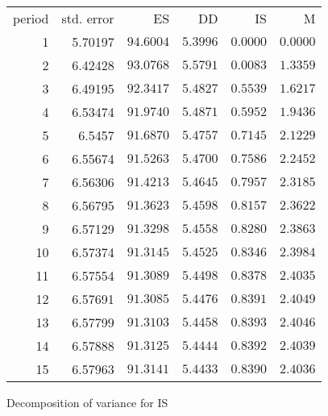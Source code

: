 \documentclass[11pt]{article}
\begin{document}
\begin{longtable}{rrrrrr}
period &  std. error &  ES &  DD &  IS &  M \\
1 & 5.70197 & $94.6004$ & $5.3996$ & $0.0000$ & $0.0000$\\
2 & 6.42428 & $93.0768$ & $5.5791$ & $0.0083$ & $1.3359$\\
3 & 6.49195 & $92.3417$ & $5.4827$ & $0.5539$ & $1.6217$\\
4 & 6.53474 & $91.9740$ & $5.4871$ & $0.5952$ & $1.9436$\\
5 & 6.5457 & $91.6870$ & $5.4757$ & $0.7145$ & $2.1229$\\
6 & 6.55674 & $91.5263$ & $5.4700$ & $0.7586$ & $2.2452$\\
7 & 6.56306 & $91.4213$ & $5.4645$ & $0.7957$ & $2.3185$\\
8 & 6.56795 & $91.3623$ & $5.4598$ & $0.8157$ & $2.3622$\\
9 & 6.57129 & $91.3298$ & $5.4558$ & $0.8280$ & $2.3863$\\
10 & 6.57374 & $91.3145$ & $5.4525$ & $0.8346$ & $2.3984$\\
11 & 6.57554 & $91.3089$ & $5.4498$ & $0.8378$ & $2.4035$\\
12 & 6.57691 & $91.3085$ & $5.4476$ & $0.8391$ & $2.4049$\\
13 & 6.57799 & $91.3103$ & $5.4458$ & $0.8393$ & $2.4046$\\
14 & 6.57888 & $91.3125$ & $5.4444$ & $0.8392$ & $2.4039$\\
15 & 6.57963 & $91.3141$ & $5.4433$ & $0.8390$ & $2.4036$\\
\end{longtable}

\vspace{1em}

Decomposition of variance for IS

\vspace{1em}
\end{document}
